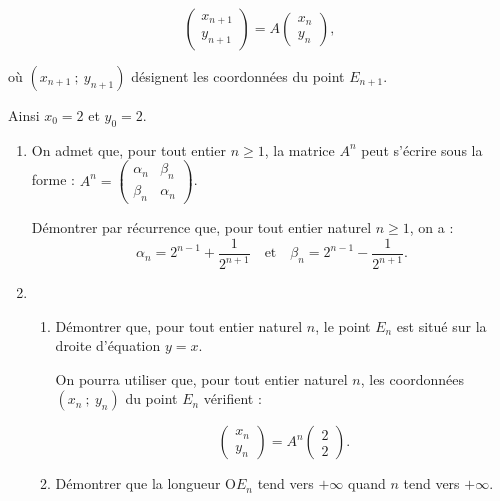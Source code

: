 \documentclass[10pt]{article}
\begin{document}
\[\begin{pmatrix}x_{n+1}\\y_{n+1}\end{pmatrix} = A\begin{pmatrix}x_{n}\\y_{n}\end{pmatrix},\] 

où $\left(x_{n+1}~;~y_{n+1}\right)$ désignent les coordonnées du point $E_{n+1}$.

Ainsi $x_{0} = 2$ et $y_{0} = 2$. 

\medskip

\begin{enumerate}
\item On admet que, pour tout entier $n \geqslant 1$, la matrice $A^n$ peut s'écrire sous la forme : $A^{n} = \begin{pmatrix}\alpha_{n}&\beta_{n}\\\beta_{n}&\alpha_{n}\end{pmatrix}$. 

Démontrer par récurrence que, pour tout entier naturel $n \geqslant 1$, on a : 
\[\alpha_{n} = 2^{n-1}  + \dfrac{1}{2^{n+1}} \quad \text{et}\quad  \beta_{n} = 2^{n-1}  - \dfrac{1}{2^{n+1}}.\] 
 
\item 
	\begin{enumerate}
		\item Démontrer que, pour tout entier naturel $n$, le point $E_{n}$ est situé sur la droite d'équation $y = x$.
		 
On pourra utiliser que, pour tout entier naturel $n$, les coordonnées $\left(x_{n}~;~y_{n}\right)$ du point $E_{n}$ vérifient :

\[\begin{pmatrix}x_{n}\\y_{n}\end{pmatrix} = A^n \begin{pmatrix}2\\2\end{pmatrix}.\]
 
		\item Démontrer que la longueur O$E_{n}$ tend vers $+ \infty$ quand $n$ tend vers $+ \infty$.
	\end{enumerate}
\end{enumerate}

\newpage
\end{document}
